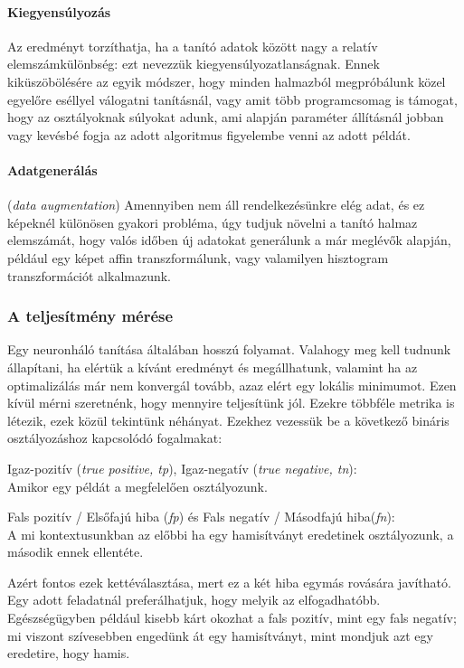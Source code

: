 \paragraph{Kiegyensúlyozás}
Az eredményt torzíthatja, ha a tanító adatok között
nagy a relatív elemszámkülönbség: ezt nevezzük kiegyensúlyozatlanságnak.
Ennek kiküszöbölésére az egyik módszer, hogy minden halmazból 
megpróbálunk közel egyelőre eséllyel válogatni tanításnál, vagy
amit több programcsomag is támogat, hogy az osztályoknak súlyokat adunk,
ami alapján paraméter állításnál jobban vagy kevésbé fogja
az adott algoritmus figyelembe venni az adott példát.

\paragraph{Adatgenerálás} (\textit{data augmentation})
Amennyiben nem áll rendelkezésünkre elég adat, és ez képeknél 
különösen gyakori probléma, úgy tudjuk növelni a tanító halmaz
elemszámát, hogy valós időben új adatokat generálunk a már
meglévők alapján, például egy képet affin transzformálunk,
vagy valamilyen hisztogram transzformációt alkalmazunk.


\subsubsection{A teljesítmény mérése}

Egy neuronháló tanítása általában hosszú folyamat. Valahogy meg kell
tudnunk állapítani, ha elértük a kívánt eredményt és megállhatunk,
valamint ha az optimalizálás már nem konvergál tovább, azaz elért egy 
lokális minimumot.
Ezen kívül mérni szeretnénk, hogy mennyire teljesítünk jól. 
Ezekre többféle metrika is létezik, ezek közül tekintünk néhányat.
Ezekhez vezessük be a következő bináris osztályozáshoz kapcsolódó fogalmakat:


Igaz-pozitív (\textit{true positive, tp}), 
Igaz-negatív (\textit{true negative, tn}): \\
Amikor egy példát a megfelelően osztályozunk.

Fals pozitív / Elsőfajú hiba (\textit{fp}) 
és Fals negatív / Másodfajú hiba(\textit{fn}): \\
A mi kontextusunkban az előbbi ha egy hamisítványt eredetinek
osztályozunk, a második ennek ellentéte.

Azért fontos ezek kettéválasztása, mert ez a két hiba egymás rovására 
javítható. Egy adott feladatnál preferálhatjuk, hogy melyik az elfogadhatóbb.
Egészségügyben például kisebb kárt okozhat a fals pozitív, mint egy fals negatív;
mi viszont szívesebben engedünk át egy hamisítványt, mint mondjuk  azt egy eredetire, hogy hamis.



